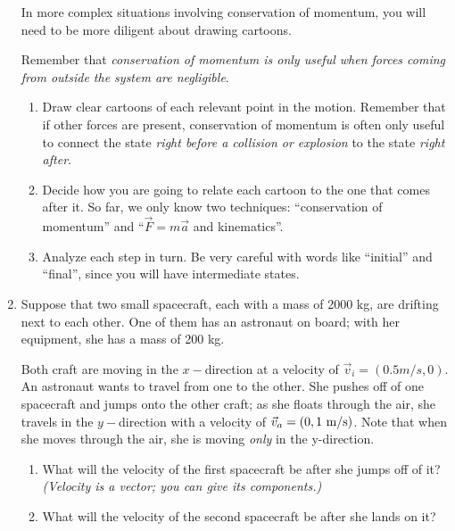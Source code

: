 \documentclass[12pt]{article}
\begin{document}
\begin{enumerate}
		
		In more complex situations involving conservation of momentum, you will need to be more diligent about drawing cartoons.
		
		Remember that {\it conservation of momentum is only useful when forces coming from outside the system are negligible}. 
		
		\begin{enumerate}
			\item Draw clear cartoons of each relevant point in the motion. Remember that if other forces are present, conservation of momentum is often only useful to connect the state {\it right before a collision or explosion} to the state {\it right after}.
			\item Decide how you are going to relate each cartoon to the one that comes after it. So far, we only know two techniques: ``conservation of momentum'' and ``$\vec F = m \vec a$ and kinematics''.
			\item Analyze each step in turn. Be very careful with words like ``initial'' and ``final'', since you will have intermediate states.
		\end{enumerate}

\vspace{0.5in}

\item Suppose that two small spacecraft, each with a mass of 2000 kg, are drifting next to each other. One of them has an astronaut on board; with her equipment, she has a mass of 200 kg. 

	Both craft are moving in the $x-$direction at a velocity of $\vec v_i = (0.5 m/s, 0)$. An astronaut wants to travel from one to the other. She pushes off of one spacecraft and jumps onto the other craft; as she floats through the air, she travels in the $y-$direction with a velocity of $\vec v_a = (0, 1~\rm m/\rm s)$. Note that when she moves through the air, she is moving {\it only} in the y-direction.


		\begin{enumerate}
			\item What will the velocity of the first spacecraft be after she jumps off of it? {\it (Velocity is a vector; you can give its components.)}
			
			\vspace{2.5in}\newpage
			
			\item What will the velocity of the second spacecraft be after she lands on it?
			
			\vspace{3.5in}
			

\end{enumerate}
\end{enumerate}
\end{document}
